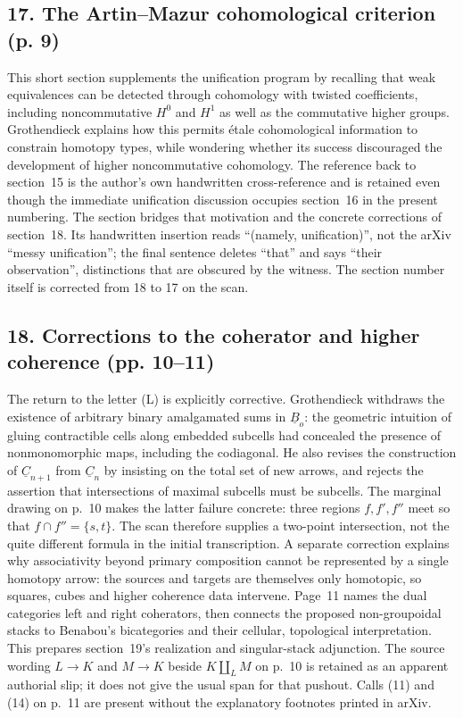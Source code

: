 \subsection*{17. The Artin--Mazur cohomological criterion (p. 9)}
This short section supplements the unification program by recalling that weak equivalences can be detected through cohomology with twisted coefficients, including noncommutative $H^0$ and $H^1$ as well as the commutative higher groups. Grothendieck explains how this permits étale cohomological information to constrain homotopy types, while wondering whether its success discouraged the development of higher noncommutative cohomology. The reference back to section~15 is the author's own handwritten cross-reference and is retained even though the immediate unification discussion occupies section~16 in the present numbering. The section bridges that motivation and the concrete corrections of section~18. Its handwritten insertion reads ``(namely, unification)'', not the arXiv ``messy unification''; the final sentence deletes ``that'' and says ``their observation'', distinctions that are obscured by the witness. The section number itself is corrected from 18 to 17 on the scan.


\subsection*{18. Corrections to the coherator and higher coherence (pp. 10--11)}
The return to the letter (L) is explicitly corrective. Grothendieck withdraws the existence of arbitrary binary amalgamated sums in $\underline B_o$: the geometric intuition of gluing contractible cells along embedded subcells had concealed the presence of nonmonomorphic maps, including the codiagonal. He also revises the construction of $\underline C_{n+1}$ from $\underline C_n$ by insisting on the total set of new arrows, and rejects the assertion that intersections of maximal subcells must be subcells. The marginal drawing on p.~10 makes the latter failure concrete: three regions $f,f',f''$ meet so that $f\cap f''=\{s,t\}$. The scan therefore supplies a two-point intersection, not the quite different formula in the initial transcription. A separate correction explains why associativity beyond primary composition cannot be represented by a single homotopy arrow: the sources and targets are themselves only homotopic, so squares, cubes and higher coherence data intervene. Page~11 names the dual categories left and right coherators, then connects the proposed non-groupoidal stacks to Benabou's bicategories and their cellular, topological interpretation. This prepares section~19's realization and singular-stack adjunction. The source wording $L\to K$ and $M\to K$ beside $K\amalg_L M$ on p.~10 is retained as an apparent authorial slip; it does not give the usual span for that pushout. Calls (11) and (14) on p.~11 are present without the explanatory footnotes printed in arXiv.

